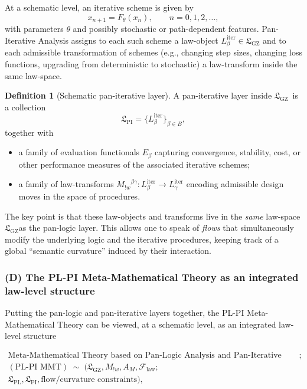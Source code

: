 \documentclass[11pt]{book}
\theoremstyle{plain}
\theoremstyle{definition}
\newtheorem{definition}[theorem]{Definition} \theoremstyle{remark}
\newcommand{\PLPIMMTCN}{\PLPIMMTEN} \newcommand{\PLPIMMTEN}{\text{Meta-Mathematical Theory based on Pan-Logic Analysis and Pan-Iterative Analysis}}
\newcommand{\PLPIMMT}{\text{PL-PI MMT}}
\newcommand{\GZLS}{\ensuremath{\mathfrak{L}_{\mathrm{GZ}}}}       \newcommand{\GZLT}{\ensuremath{M_{!w}}}                           \newcommand{\GZLOC}{\ensuremath{A_M}}                             \newcommand{\GZLCurv}{\ensuremath{\mathcal{F}_{\mathrm{law}}}}
\begin{document}
At a schematic level, an iterative scheme is given by
\[
   x_{n+1} = F_\theta(x_n),\qquad n=0,1,2,\dots,
\]
with parameters $\theta$ and possibly stochastic or path-dependent
features. Pan-Iterative Analysis assigns to each such scheme a
law-object $L^{\mathrm{iter}}_\beta\in\GZLS$ and to each admissible
transformation of schemes (e.g., changing step sizes, changing loss
functions, upgrading from deterministic to stochastic) a law-transform
inside the same law-space.



\begin{definition}[Schematic pan-iterative layer]
  A pan-iterative layer inside \GZLS\ is a collection
  \[
    \mathfrak{L}_{\mathrm{PI}}
    = \{L^{\mathrm{iter}}_\beta\}_{\beta\in B},
  \]
  together with
  \begin{itemize}
    \item a family of evaluation functionals
          $E_\beta$ capturing convergence, stability, cost, or other
          performance measures of the associated iterative schemes;
    \item a family of law-transforms
          $\GZLT^{\beta\gamma}\colon
          L^{\mathrm{iter}}_\beta\to L^{\mathrm{iter}}_\gamma$
          encoding admissible design moves in the space of procedures.
  \end{itemize}
\end{definition}



The key point is that these law-objects and transforms live in the
\emph{same} law-space \GZLS as the pan-logic layer. This allows one to
speak of \emph{flows} that simultaneously modify the underlying logic
and the iterative procedures, keeping track of a global “semantic
curvature” induced by their interaction.



\subsubsection*{(D) The PL-PI Meta-Mathematical Theory as an integrated law-level structure}

Putting the pan-logic and pan-iterative layers together, the PL-PI
Meta-Mathematical Theory can be viewed, at a schematic level, as an
integrated law-level structure

\begin{multline*}
   \PLPIMMTCN ;\\(\PLPIMMT)
   \;\sim\;
   (\GZLS,\GZLT,\GZLOC,\GZLCurv;\\
    \mathfrak{L}_{\mathrm{PL}},\mathfrak{L}_{\mathrm{PI}},
    \text{flow/curvature constraints}),
\end{multline*}
\end{document}
